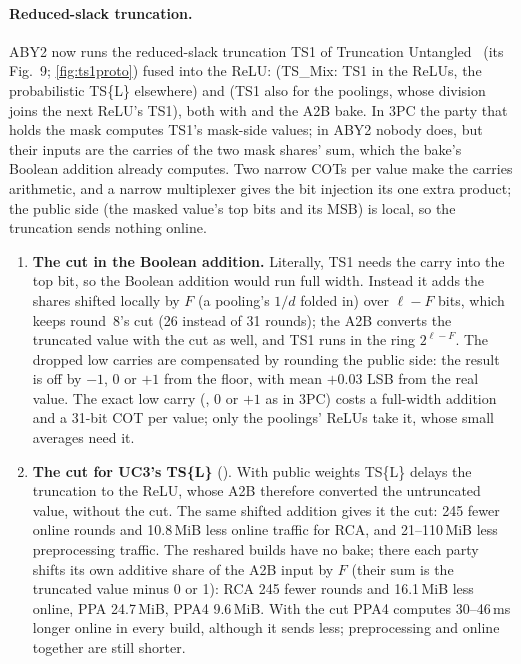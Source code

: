 \paragraph{Reduced-slack truncation.}\label{sec:triadts1} ABY2 now runs the reduced-slack truncation TS1 of
Truncation Untangled~\cite{tu} (its Fig.~9; \cref{fig:ts1proto}) fused into the ReLU:  (TS\_Mix: TS1 in the ReLUs, the
probabilistic TS\{L\} elsewhere) and  (TS1 also for the poolings, whose division joins the next
ReLU's TS1), both with  and the A2B bake. In 3PC the party that holds the mask computes TS1's
mask-side values; in ABY2 nobody does, but their inputs are the carries of the two mask shares' sum, which the bake's
Boolean addition already computes. Two narrow COTs per value make the carries arithmetic, and a narrow multiplexer
gives the bit injection its one extra product; the public side (the masked value's top bits and its MSB) is local, so
the truncation sends nothing online.
\begin{enumerate}\itemsep1pt
\item \textbf{The cut in the Boolean addition.} Literally, TS1 needs the carry into the top bit, so the Boolean addition
  would run full width. Instead it adds the shares shifted locally by $F$ (a pooling's $1/d$ folded in) over
  $\ell - F$ bits, which keeps round~8's cut (26 instead of 31 rounds); the A2B converts the truncated value with the
  cut as well, and TS1 runs in the ring $2^{\ell-F}$. The dropped low carries are compensated by rounding the public
  side: the result is off by $-1$, 0 or $+1$ from the floor, with mean $+0.03$ LSB from the real value. The exact
  low carry (, 0 or $+1$ as in 3PC) costs a full-width addition and a 31-bit COT per value; only the
  poolings' ReLUs take it, whose small averages need it.
\item \textbf{The cut for UC3's TS\{L\}} (). With public weights TS\{L\} delays the
  truncation to the ReLU, whose A2B therefore converted the untruncated value, without the cut. The same shifted
  addition gives it the cut: 245 fewer online rounds and 10.8\,MiB less online traffic for RCA, and 21--110\,MiB less
  preprocessing traffic. The reshared builds have no bake; there each party shifts its own additive share of the
  A2B input by $F$ (their sum is the truncated value minus 0 or 1): RCA 245 fewer rounds and 16.1\,MiB less online,
  PPA 24.7\,MiB, PPA4 9.6\,MiB. With the cut PPA4 computes 30--46\,ms longer online in every build, although it sends
  less; preprocessing and online together are still shorter.
\end{enumerate}
